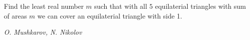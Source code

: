 Find the least real number $m$ such that with all $5$ equilaterial triangles with sum of areas $m$ we can cover an equilaterial triangle with side 1.

\textit{O. Mushkarov, N. Nikolov}